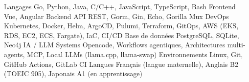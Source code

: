 \documentclass[11pt, a4paper]{awesome-cv}
\begin{document}
\makecvheader




\begin{cvskills}
  \cvskill
    {Langages}
    {Go, Python, Java, C/C++, JavaScript, TypeScript, Bash}
  \cvskill
    {Frontend}
    {Vue, Angular}
  \cvskill
    {Backend}
    {API REST, Gorm, Gin, Echo, Gorilla Mux}
  \cvskill
    {DevOps}
    {Kubernetes, Docker, Helm, ArgoCD, Pulumi, Terraform, GitOps, AWS (EKS, RDS, EC2, ECS, Fargate), IaC, CI/CD}
  \cvskill
    {Base de données}
    {PostgreSQL, SQLite, Neo4j}
  \cvskill
    {IA / LLM Systems}
    {Opencode, Workflows agentiques, Architectures multi-agents, MCP, Local LLMs (llama.cpp, llama-swap)}
  \cvskill
    {Environnements}
    {Linux, Git, GitHub Actions, GitLab CI}
  \cvskill
    {Langues}
    {Français (langue maternelle), Anglais B2 (TOEIC 905), Japonais A1 (en apprentissage)}
\end{cvskills}

\end{document}
